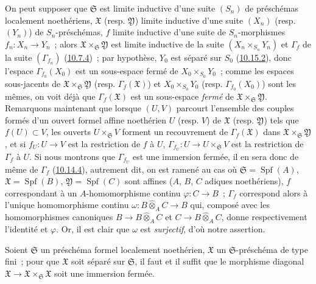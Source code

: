 On peut supposer que $\mathfrak{S}$ est limite inductive d'une suite
$(S_n)$ de préschémas localement noethériens, $\mathfrak{X}$ (resp.
$\mathfrak{Y}$) limite inductive d'une suite $(X_n)$ (resp. $(Y_n)$) de
$S_n$-préschémas, $f$ limite inductive d'une suite de $S_n$-morphismes
$f_n:X_n\to Y_n$~; alors
$\mathfrak{X}\times_{\mathfrak{S}}\mathfrak{Y}$ est limite inductive de la
suite $(X_n\times_{S_n}Y_n)$ et $\Gamma_f$ de la suite
$(\Gamma_{f_n})$ (\hyperref[I.10.7.4-fr]{10.7.4})~; par hypothèse, $Y_0$ est
séparé sur $S_0$ (\hyperref[I.10.15.2-fr]{10.15.2}), donc l'espace
$\Gamma_{f_0}(X_0)$ est un sous-espace fermé de
$X_0\times_{S_0}Y_0$~; comme les espaces sous-jacents de
$\mathfrak{X}\times_{\mathfrak{S}}\mathfrak{Y}$ (resp.
$\Gamma_f(\mathfrak{X})$) et $X_0\times_{S_0}Y_0$ (resp.
$\Gamma_{f_0}(X_0)$) sont les mêmes, on voit déjà que
$\Gamma_f(\mathfrak{X})$ est un sous-espace \emph{fermé} de
$\mathfrak{X}\times_{\mathfrak{S}}\mathfrak{Y}$. Remarquons maintenant que
lorsque $(U,V)$ parcourt l'ensemble des couples formés d'un ouvert formel
affine noethérien $U$ (resp. $V$) de $\mathfrak{X}$ (resp.
$\mathfrak{Y}$) tels que $f(U)\subset V$, les ouverts
$U\times_{\mathfrak{S}}V$ forment un recouvrement de
$\Gamma_f(\mathfrak{X})$ dans
$\mathfrak{X}\times_{\mathfrak{S}}\mathfrak{Y}$, et si
$f_U:U\to V$ est la restriction de $f$ à $U$,
$\Gamma_{f_U}:U\to U\times_{\mathfrak{S}}V$ est la restriction de
$\Gamma_f$ à $U$. Si nous montrons que $\Gamma_{f_U}$ est une immersion
fermée, il en sera donc de même de $\Gamma_f$
(\hyperref[I.10.14.4-fr]{10.14.4}), autrement dit, on est ramené au cas où
$\mathfrak{S}=\operatorname{Spf}(A)$,
$\mathfrak{X}=\operatorname{Spf}(B)$,
$\mathfrak{Y}=\operatorname{Spf}(C)$ sont affines ($A$, $B$, $C$ adiques
noethériens), $f$ correspondant à un $A$-homomorphisme continu
$\varphi:C\to B$~; $\Gamma_f$ correspond alors à l'unique homomorphisme
continu $\omega:B\widehat{\otimes}_A C\to B$ qui, composé avec les
homomorphismes canoniques $B\to B\widehat{\otimes}_A C$ et
$C\to B\widehat{\otimes}_A C$, donne respectivement l'identité et
$\varphi$. Or, il est clair que $\omega$ est \emph{surjectif}, d'où notre
assertion.

\begin{corollary}[10.15.5]
\label{I.10.15.5-fr}
Soient $\mathfrak{S}$ un préschéma formel localement noethérien,
$\mathfrak{X}$ un $\mathfrak{S}$-préschéma de type fini~; pour que
$\mathfrak{X}$ soit séparé sur $\mathfrak{S}$, il faut et il suffit que le
morphisme diagonal
$\mathfrak{X}\to\mathfrak{X}\times_{\mathfrak{S}}\mathfrak{X}$ soit une
immersion fermée.
\end{corollary}

